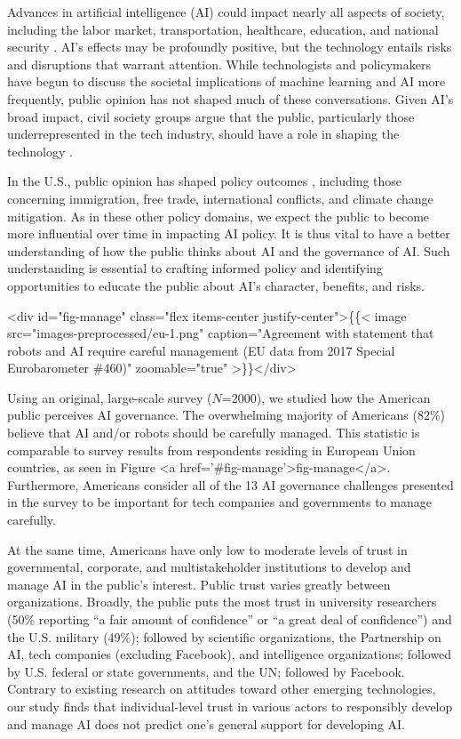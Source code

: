 \documentclass{article}
\begin{document}
\noindent Advances in artificial intelligence (AI) could impact nearly all aspects of society, including the labor market, transportation, healthcare, education, and national security \citep{oecdai}. AI's effects may be profoundly positive, but the technology entails risks and disruptions that warrant attention. While technologists and policymakers have begun to discuss the societal implications of machine learning and AI more frequently, public opinion has not shaped much of these conversations. Given AI's broad impact, civil society groups argue that the public, particularly those underrepresented in the tech industry, should have a role in shaping the technology \citep{west2019}.

In the U.S., public opinion has shaped policy outcomes \citep{caughey2018policy}, including those concerning immigration, free trade, international conflicts, and climate change mitigation. As in these other policy domains, we expect the public to become more influential over time in impacting AI policy. It is thus vital to have a better understanding of how the public thinks about AI and the governance of AI. Such understanding is essential to crafting informed policy and identifying opportunities to educate the public about AI's character, benefits, and risks.

<div id="fig-manage" class="flex items-center justify-center">\{\{< image src="images-preprocessed/eu-1.png" caption="Agreement with statement that robots and AI require careful management (EU data from 2017 Special Eurobarometer \#460)" zoomable="true" >\}\}</div>



Using an original, large-scale survey ($N$=2000), we studied how the American public perceives AI governance. The overwhelming majority of Americans (82\%) believe that AI and/or robots should be carefully managed. This statistic is comparable to survey results from respondents residing in European Union countries, as seen in Figure <a href='#fig-manage'>fig-manage</a>. Furthermore, Americans consider all of the 13 AI governance challenges presented in the survey to be important for tech companies and governments to manage carefully. 

At the same time, Americans have only low to moderate levels of trust in governmental, corporate, and multistakeholder institutions to develop and manage AI in the public's interest. Public trust varies greatly between organizations. Broadly, the public puts the most trust in university researchers (50\% reporting ``a fair amount of confidence'' or ``a great deal of confidence'') and the U.S. military (49\%); followed by scientific organizations, the Partnership on AI, tech companies (excluding Facebook), and intelligence organizations; followed by U.S. federal or state governments, and the UN; followed by Facebook. Contrary to existing research on attitudes toward other emerging technologies, our study finds that individual-level trust in various actors to responsibly develop and manage AI does not predict one's general support for developing AI. 
\end{document}
